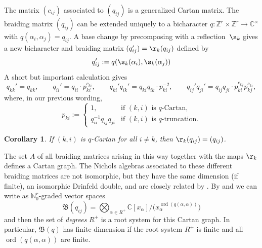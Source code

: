 \documentclass[10pt,a4paper]{amsart}
\numberwithin{equation}{section}
\newtheorem{cor}[teo]{Corollary}
\newcommand{\N}{\mathbb{N}}
\newcommand{\Z}{\mathbb{Z}}
\newcommand{\C}{\mathbb{C}}
\begin{document}
The matrix $(c_{ij})$ associated to $(q_{ij})$ is a generalized Cartan matrix. The braiding matrix $(q_{ij})$ can be extended uniquely to a bicharacter $q\colon \Z^r\times \Z^r\to \C^\times$ with $q(\alpha_i,\alpha_j)=q_{ij}$. A base change by precomposing with a reflection~$\s_k$ gives a new bicharacter and braiding matrix $(q_{ij}')=\r_k(q_{ij})$ defined by
\[q_{ij}':=q(\s_k(\alpha_i),\s_k(\alpha_j))\]
A short but important calculation \cite[equation~(3)]{Heck05} gives
\[
q_{kk}'=q_{kk},\qquad
q_{ii}'=q_{ii}\cdot p_{ki}^{c_{ki}},\qquad
q_{ki}'q_{ik}'=q_{ki}q_{ik}\cdot p_{ki}^{-2},\qquad
q_{ij}'q_{ji}'=q_{ij}q_{ji}\cdot p_{ki}^{c_{kj}}p_{kj}^{c_{ki}},
\]
where, in our previous wording,
\[p_{ki}:=\begin{cases}
1,&\text{if $(k,i)$ is $q$-Cartan},\\
q_{ii}^{-1}q_{ij}q_{ji}&\text{if $(k,i)$ is $q$-truncation}.
\end{cases}
\]
\begin{cor}
If $(k,i)$ is $q$-Cartan for all $i\neq k$, then $\r_k(q_{ij})=(q_{ij})$.
\end{cor}
The set $A$ of all braiding matrices arising in this way together with the maps $\r_k$ defines a Cartan graph. The Nichols algebras associated to these different braiding matrices are not isomorphic, but they have the same dimension (if finite), an isomorphic Drinfeld double, and are closely related by \cite{BLS15, Heck07,HS11}. By \cite[Remark~2.8]{AHS10} and \cite[Theorem~3.13]{Heck07} we can write as $\N_0^r$-graded vector spaces
\[\mathfrak{B}(q_{ij})= \bigotimes_ {\alpha\in R^+} \C[x_\alpha]/\big(x_\alpha^{\operatorname{ord}(q(\alpha,\alpha))}\big)\]
and then the set of \emph{degrees} $R^+$ is a root system for this Cartan graph. In particular, $\mathfrak{B}(q)$ has finite dimension if the root system $R^+$ is finite and all $\operatorname{ord}(q(\alpha,\alpha))$ are finite.
\end{document}
